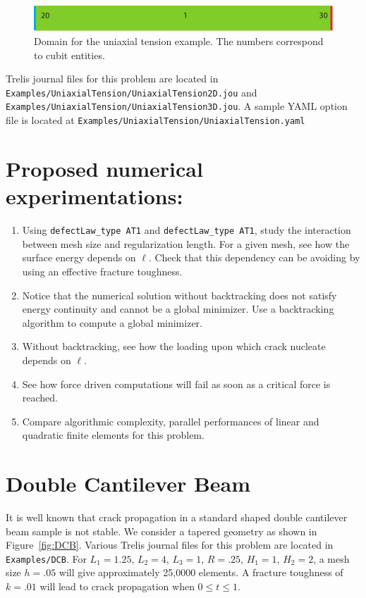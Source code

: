 \documentclass[10pt,oneside]{memoir}
\begin{document}
\begin{figure}[H]
\centering
	\includegraphics[width = \textwidth]{Examples/UniaxialTension/Geometry.pdf}
\caption{Domain for the uniaxial tension example. The numbers correspond to cubit entities.}
\label{fig:Uniaxial}
\end{figure}

Trelis journal files for this problem are located in \verb+Examples/UniaxialTension/UniaxialTension2D.jou+ and \verb+Examples/UniaxialTension/UniaxialTension3D.jou+. A sample YAML option file is located at \verb+Examples/UniaxialTension/UniaxialTension.yaml+

\section*{Proposed numerical experimentations:}
\begin{enumerate}
	\item	Using \verb+defectLaw_type AT1+ and \verb+defectLaw_type AT1+, study the interaction between mesh size and regularization length. For a given mesh, see how the surface energy depends on $\ell$. Check that this dependency can be avoiding by using an effective fracture toughness.
	\item Notice that the numerical solution without backtracking does not satisfy energy continuity and cannot be a global minimizer. Use a backtracking algorithm to compute a global minimizer.
	\item Without backtracking, see how the loading upon which crack nucleate depends on $\ell$.
	\item See how force driven computations will fail as soon as a critical force is reached.
	\item Compare algorithmic complexity, parallel performances of linear and quadratic finite elements for this problem.
\end{enumerate}

\section{Double Cantilever Beam}
It is well known that crack propagation in a standard shaped double cantilever beam sample is not stable. We consider a tapered geometry as shown in Figure~\ref{fig:DCB}. Various Trelis journal files for this problem are located in \verb+Examples/DCB+. For $L_1=1.25$, $L_2 = 4$, $L_3=1$, $R = .25$, $H_1=1$, $H_2 = 2$, a mesh size $h=.05$ will give approximately 25,0000 elements. A fracture toughness of $k=.01$ will lead to crack propagation when $0 \le t \le 1$.
\end{document}
